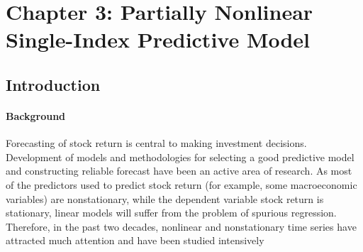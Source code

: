 \documentclass[a4paper,12pt,times,numbered,print,index]{report}
\numberwithin{equation}{section}
\begin{document}
		
		
		
		
		
		
		
		
		
		

		


\chapter*{Chapter 3: Partially Nonlinear Single-Index Predictive Model}

\section{Introduction}

\subsubsection{Background}

Forecasting of stock return is central to making investment decisions. Development of models and methodologies for selecting a good predictive model and constructing reliable forecast have been an active area of research. As most of the predictors used to predict stock return (for example, some macroeconomic variables) are nonstationary, while the dependent variable stock return is stationary, linear models will suffer from the problem of spurious regression. Therefore, in the past two decades, nonlinear and nonstationary time series have attracted much attention and have been studied intensively
\end{document}

